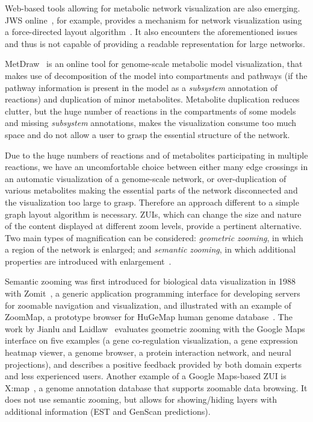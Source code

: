 \documentclass{bmcart}
\begin{document}
Web-based tools allowing for metabolic network visualization are also emerging.  JWS online~\cite{Snoep2003}, for example, provides a mechanism for network visualization using a force-directed layout algorithm~\cite{Fruchterman1991, Tamassia:2007:HGD:1202383}. It also encounters the aforementioned issues and thus is not capable of providing a readable representation for large networks.  

MetDraw~\cite{Jensen2014} is an online tool for genome-scale metabolic model visualization, that makes use of decomposition of the model into compartments and pathways (if the pathway information is present in the model as a \emph{subsystem} annotation of reactions) and duplication of minor metabolites. Metabolite duplication reduces clutter, but the huge number of reactions in the compartments of some models and missing \emph{subsystem} annotations, makes the visualization consume too much space and do not allow a user to grasp the essential structure of the network.

Due to the huge numbers of reactions and of metabolites participating in multiple reactions, we have an uncomfortable choice between either many edge crossings in an automatic visualization of a genome-scale network, or over-duplication of various metabolites making the essential parts of the network disconnected and the visualization too large to grasp. Therefore an approach different to a simple graph layout algorithm is necessary. ZUIs, which can change the size and nature of the content displayed at different zoom levels, provide a pertinent alternative. Two main types of magnification can be considered: \emph{geometric zooming}, in which a region of the network is enlarged; and \emph{semantic zooming}, in which additional properties are introduced with enlargement~\cite{Hu2007}.

Semantic zooming was first introduced for biological data visualization in 1988 with Zomit~\cite{Pook1998}, a generic application programming interface for developing  servers for zoomable navigation and visualization, and illustrated with an example of ZoomMap, a prototype browser for HuGeMap human genome database~\cite{Barillot1998}. The work by Jianlu and Laidlaw~\cite{Jianu2013} evaluates geometric zooming with the Google Maps interface on five examples (a gene co-regulation visualization, a gene expression heatmap viewer, a genome browser, a protein interaction network, and  neural projections), and describes a positive feedback provided by both domain experts and less experienced users. Another example of a Google Maps-based ZUI is X:map~\cite{Yates2008}, a genome annotation database that supports zoomable data browsing. It does not use semantic zooming, but allows for showing/hiding layers with additional information (EST and GenScan predictions).
\end{document}
